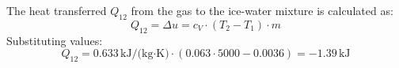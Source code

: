 The heat transferred \( Q_{12} \) from the gas to the ice-water mixture is calculated as:  
\[
Q_{12} = \Delta u = c_V \cdot (T_2 - T_1) \cdot m
\]  
Substituting values:  
\[
Q_{12} = 0.633 \, \text{kJ/(kg·K)} \cdot (0.063 \cdot 5000 - 0.0036) = -1.39 \, \text{kJ}
\]
